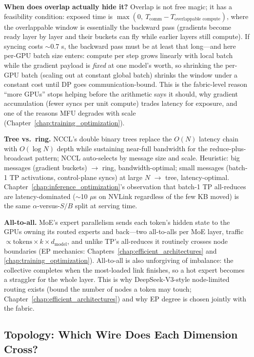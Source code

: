 \textbf{When does overlap actually hide it?} Overlap is not free magic; it has a feasibility condition: exposed time is $\max(0,\ T_{\text{comm}} - T_{\text{overlappable compute}})$, where the overlappable window is essentially the backward pass (gradients become ready layer by layer and their buckets can fly while earlier layers still compute). If syncing costs $\sim$0.7 s, the backward pass must be at least that long---and here per-GPU batch size enters: compute per step grows linearly with local batch while the gradient payload is \textit{fixed} at one model's worth, so shrinking the per-GPU batch (scaling out at constant global batch) shrinks the window under a constant cost until DP goes communication-bound. This is the fabric-level reason ``more GPUs'' stops helping before the arithmetic says it should, why gradient accumulation (fewer syncs per unit compute) trades latency for exposure, and one of the reasons MFU degrades with scale (Chapter~\ref{chap:training_optimization}).

\textbf{Tree vs.\ ring.} NCCL's double binary trees replace the $O(N)$ latency chain with $O(\log N)$ depth while sustaining near-full bandwidth for the reduce-plus-broadcast pattern; NCCL auto-selects by message size and scale. Heuristic: big messages (gradient buckets) $\to$ ring, bandwidth-optimal; small messages (batch-1 TP activations, control-plane syncs) at large $N$ $\to$ tree, latency-optimal. Chapter~\ref{chap:inference_optimization}'s observation that batch-1 TP all-reduces are latency-dominated ($\sim$10 $\mu$s on NVLink regardless of the few KB moved) is the same $\alpha$-versus-$S/B$ split at serving time.

\textbf{All-to-all.} MoE's expert parallelism sends each token's hidden state to the GPUs owning its routed experts and back---two all-to-alls per MoE layer, traffic $\propto \text{tokens} \times k \times d_{\text{model}}$, and unlike TP's all-reduces it routinely crosses node boundaries (EP mechanics: Chapters~\ref{chap:efficient_architectures} and \ref{chap:training_optimization}). All-to-all is also unforgiving of imbalance: the collective completes when the most-loaded link finishes, so a hot expert becomes a straggler for the whole layer. This is why DeepSeek-V3-style node-limited routing exists (bound the number of nodes a token may touch; Chapter~\ref{chap:efficient_architectures}) and why EP degree is chosen jointly with the fabric.

\subsection{Topology: Which Wire Does Each Dimension Cross?}

